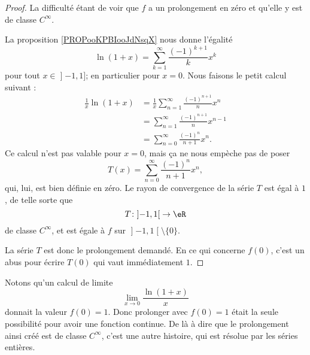 \begin{proof}
	La difficulté étant de voir que \( f\) a un prolongement en zéro et qu'elle y est de classe \(  C^{\infty}\).

	La proposition \ref{PROPooKPBIooJdNsqX} nous donne l'égalité
	\begin{equation}
		\ln(1+x)=\sum_{k=1}^{\infty}\frac{ (-1)^{k+1} }{ k }x^k
	\end{equation}
	pour tout \( x\in \mathopen] -1 , 1 \mathclose]\); en particulier pour \( x=0\). Nous faisons le petit calcul suivant :
	\begin{subequations}        \label{SUBEQooRLQOooEzNFDp}
		\begin{align}
			\frac{1}{ x }\ln(1+x) & = \frac{1}{ x }\sum_{n=1}^{\infty}\frac{ (-1)^{n+1} }{ n }x^n \\
			                      & =\sum_{n=1}^{\infty}\frac{ (-1)^{n+1} }{ n }x^{n-1}           \\
			                      & =\sum_{n=0}^{\infty}\frac{ (-1)^n }{ n+1 }x^n.
		\end{align}
	\end{subequations}
	Ce calcul n'est pas valable pour \( x=0\), mais ça ne nous empèche pas de poser
	\begin{equation}
		T(x)=\sum_{n=0}^{\infty}\frac{ (-1)^n }{ n+1 }x^n,
	\end{equation}
	qui, lui, est bien définie en zéro. Le rayon de convergence de la série \( T\) est égal à \( 1\), de telle sorte que
	\begin{equation}
		T\colon \mathopen] -1 , 1 \mathclose[\to \eR \\
	\end{equation}
	de classe \(  C^{\infty}\), et est égale à \( f\) sur \( \mathopen] -1 , 1 \mathclose[\setminus\{ 0 \}\).

	La série \( T\) est donc le prolongement demandé. En ce qui concerne \( f(0)\), c'est un abus pour écrire \( T(0)\) qui vaut immédiatement \( 1\).
\end{proof}

Notons qu'un calcul de limite
\begin{equation}
	\lim_{x\to 0} \frac{ \ln(1+x) }{ x }
\end{equation}
donnait la valeur \( f(0)=1\). Donc prolonger avec \( f(0)=1\) était la seule possibilité pour avoir une fonction continue. De là à dire que le prolongement ainsi créé est de classe \(  C^{\infty}\), c'est une autre histoire, qui est résolue par les séries entières.

